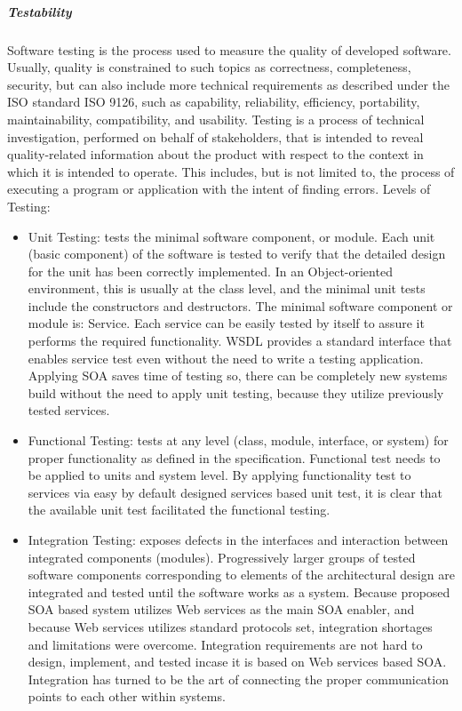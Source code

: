 \documentclass[12pt,a4paper,final,twoside,onecolumn,titlepage]{book}
\begin{document}
\subparagraph{Testability}
Software testing is the process used to measure the quality of developed software. Usually, quality is constrained to such topics as correctness, completeness, security, but can also include more technical requirements as described under the ISO standard ISO 9126, such as capability, reliability, efficiency, portability, maintainability, compatibility, and usability. Testing is a process of technical investigation, performed on behalf of stakeholders, that is intended to reveal quality-related information about the product with respect to the context in which it is intended to operate. This includes, but is not limited to, the process of executing a program or application with the intent of finding errors. Levels of Testing:
\begin{itemize}
\item Unit Testing: tests the minimal software component, or module. Each unit (basic component) of the software is tested to verify that the detailed design for the unit has been correctly implemented. In an Object-oriented environment, this is usually at the class level, and the minimal unit tests include the constructors and destructors.
The minimal software component or module is: Service. Each service can be easily tested by itself to assure it performs the required functionality. \gls{WSDL} provides a standard interface that enables service test even without the need to write a testing application. Applying SOA saves time of testing so, there can be completely new systems build without the need to apply unit testing, because they utilize previously tested services.
\item Functional Testing: tests at any level (class, module, interface, or system) for proper functionality as defined in the specification. 
Functional test needs to be applied to units and system level. By applying functionality test to services via easy by default designed services based unit test, it is clear that the available unit test facilitated the functional testing.
\item Integration Testing: exposes defects in the interfaces and interaction between integrated components (modules). Progressively larger groups of tested software components corresponding to elements of the architectural design are integrated and tested until the software works as a system.
Because proposed SOA based system utilizes Web services as the main SOA enabler, and because Web services utilizes standard protocols set, integration shortages and limitations were overcome. Integration requirements are not hard to design, implement, and tested incase it is based on Web services based SOA. Integration has turned to be the art of connecting the proper communication points to each other within systems.
\end{itemize}
\end{document}
